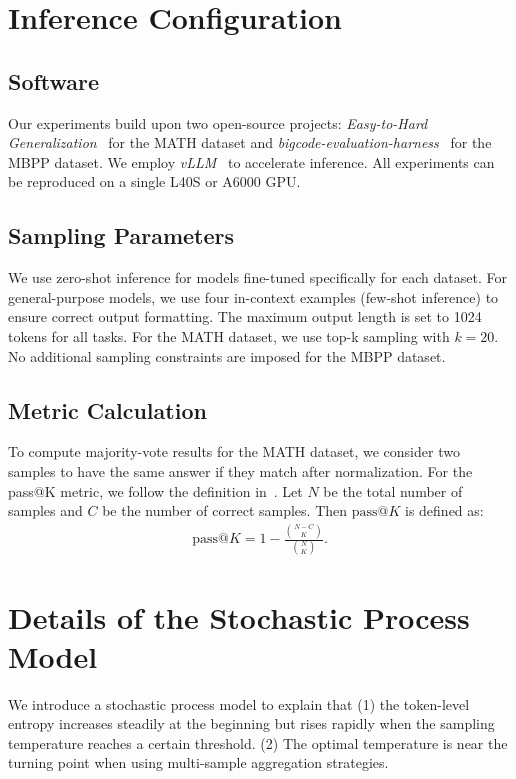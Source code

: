 \section{Inference Configuration} \label{app:inference_config}

\subsection{Software} 
Our experiments build upon two open-source projects: \emph{Easy-to-Hard Generalization}~\cite{sun2024easy} for the MATH dataset and \emph{bigcode-evaluation-harness}~\cite{bigcode-evaluation-harness} for the MBPP dataset. We employ \emph{vLLM}~\cite{kwon2023efficient} to accelerate inference. All experiments can be reproduced on a single L40S or A6000 GPU.

\subsection{Sampling Parameters}
We use zero-shot inference for models fine-tuned specifically for each dataset. For general-purpose models, we use four in-context examples (few-shot inference) to ensure correct output formatting. The maximum output length is set to 1024 tokens for all tasks. For the MATH dataset, we use top-k sampling with $k = 20$. No additional sampling constraints are imposed for the MBPP dataset.

\subsection{Metric Calculation}
To compute majority-vote results for the MATH dataset, we consider two samples to have the same answer if they match after normalization. For the pass@K metric, we follow the definition in~\citet{chen2021evaluating}. Let $N$ be the total number of samples and $C$ be the number of correct samples. Then \(\mathrm{pass}@K\) is defined as:
\begin{align}
\mathrm{pass}@K = 1 - \frac{\binom{N - C}{K}}{\binom{N}{K}}.
\end{align}
\section{Details of the Stochastic Process Model}
\label{app: toy model}
We introduce a stochastic process model to explain that (1) the token-level entropy increases steadily at the beginning but rises rapidly when the sampling temperature reaches a certain threshold. (2) The optimal temperature is near the turning point when using multi-sample aggregation strategies.

